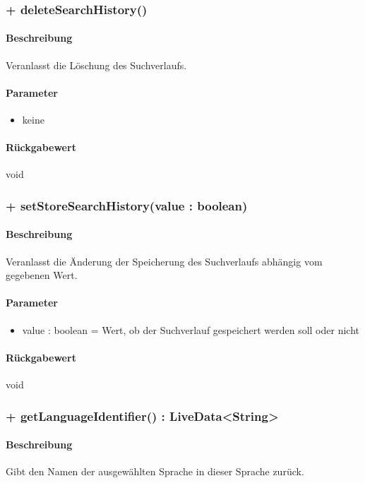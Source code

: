 \subsubsection{+ deleteSearchHistory()}%
\paragraph*{Beschreibung}
Veranlasst die Löschung des Suchverlaufs.
\paragraph*{Parameter}
\begin{itemize}
    \item keine
\end{itemize}
\paragraph*{Rückgabewert}
void

\subsubsection{+ setStoreSearchHistory(value : boolean)}%
\paragraph*{Beschreibung}
Veranlasst die Änderung der Speicherung des Suchverlaufs abhängig vom gegebenen Wert.
\paragraph*{Parameter}
\begin{itemize}
    \item value : boolean = Wert, ob der Suchverlauf gespeichert werden soll oder nicht
\end{itemize}
\paragraph*{Rückgabewert}
void

\subsubsection{+ getLanguageIdentifier() : LiveData<String>}%
\paragraph*{Beschreibung}
Gibt den Namen der ausgewählten Sprache in dieser Sprache zurück.
